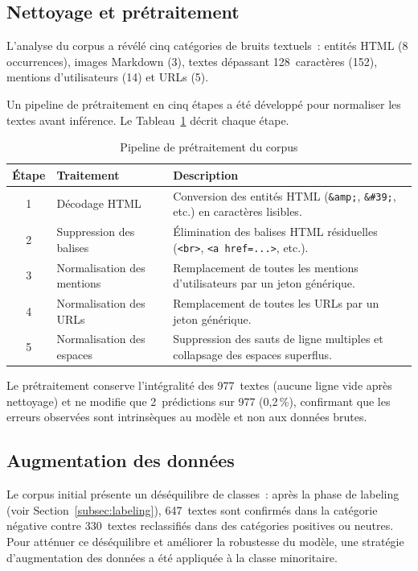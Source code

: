 \subsection{Nettoyage et prétraitement}

L'analyse du corpus a révélé cinq catégories de bruits textuels~:
entités HTML (8 occurrences), images Markdown (3),
textes dépassant 128~caractères (152),
mentions d'utilisateurs (14) et URLs (5).

Un pipeline de prétraitement en cinq étapes a été développé pour normaliser
les textes avant inférence.
Le Tableau~\ref{tab:preprocessing_steps} décrit chaque étape.

\vspace{6pt}
\begin{table}[H]
\centering
\caption{Pipeline de prétraitement du corpus}
\label{tab:preprocessing_steps}
\small
\setlength{\tabcolsep}{4pt}
\begin{tabular}{|c|p{4cm}|p{8cm}|}
\hline
\textbf{Étape} & \textbf{Traitement} & \textbf{Description} \\
\hline
1 & Décodage HTML
  & Conversion des entités HTML (\texttt{\&amp;}, \texttt{\&\#39;}, etc.)
    en caractères lisibles. \\
\hline
2 & Suppression des balises
  & Élimination des balises HTML résiduelles (\texttt{<br>}, \texttt{<a href=...>}, etc.). \\
\hline
3 & Normalisation des mentions
  & Remplacement de toutes les mentions d'utilisateurs par un jeton générique. \\
\hline
4 & Normalisation des URLs
  & Remplacement de toutes les URLs par un jeton générique. \\
\hline
5 & Normalisation des espaces
  & Suppression des sauts de ligne multiples et collapsage des espaces superflus. \\
\hline
\end{tabular}
\end{table}

Le prétraitement conserve l'intégralité des 977~textes (aucune ligne vide
après nettoyage) et ne modifie que 2~prédictions sur 977 (0,2\,\%),
confirmant que les erreurs observées sont intrinsèques au modèle
et non aux données brutes.

\subsection{Augmentation des données}

Le corpus initial présente un déséquilibre de classes~:
après la phase de labeling (voir Section~\ref{subsec:labeling}),
647~textes sont confirmés dans la catégorie négative contre 330~textes
reclassifiés dans des catégories positives ou neutres.
Pour atténuer ce déséquilibre et améliorer la robustesse du modèle,
une stratégie d'augmentation des données a été appliquée à la classe minoritaire.

